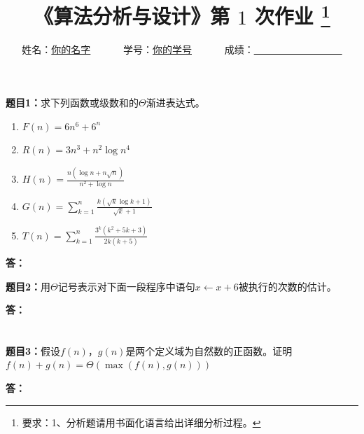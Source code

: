 \documentclass[12pt,a4paper]{article}
\begin{document}
\title{
  {\heiti《算法分析与设计》第 {$1$} 次作业
    \footnote{要求：1、分析题请用书面化语言给出详细分析过程。}
    }
}
\date{}

\author{
姓名：\underline{你的名字}~~~~~~
学号：\underline{你的学号}~~~~~~
成绩：\underline{~~~~~~~~~~~~~~~~~~}
}

\maketitle

\noindent
\section*{\bf \color{red}{算法分析题}}

\noindent
{\bf 题目1：}求下列函数或级数和的$\Theta$渐进表达式。
\begin{enumerate}
  \item[(1)]  $F(n)=6n^{6}+6^n$
  \item[(2)]  $R(n)=3n^3 + n^2 \log n^4$
  \item[(3)]  $H(n)=\frac{n (\log n + n \sqrt{n})}{n^2 + \log n}$
  \item[(4)]  $G(n)=\sum\limits_{k=1}^n\frac{k(\sqrt{k} \log k+1)}{\sqrt{k}+1}$
  \item[(5)]  $T(n)=\sum\limits_{k=1}^n\frac{3^k(k^2+5k+3)}{2k(k+5)}$
\end{enumerate}

\vspace{5pt}
\noindent
{\bf 答：}


\vspace{10pt}
\noindent
{\bf 题目2：}用$\Theta$记号表示对下面一段程序中语句$x \gets x+6$被执行的次数的估计。
\begin{algorithm}
\caption{一个算法实例}

\end{algorithm}

\vspace{5pt}
\noindent
{\bf 答：}


\section*{\bf \color{red}{证明题}}

\vspace{10pt}
\noindent
{\bf 题目3：}假设$f(n)$，$g(n)$是两个定义域为自然数的正函数。证明 $f(n)+g(n)=\varTheta(\max(f(n),g(n)))$

\vspace{5pt}
\noindent
{\bf 答：}
\end{document}
